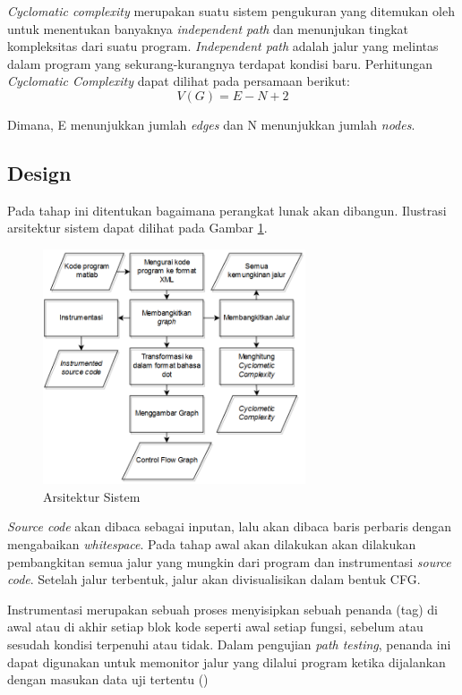 \textit{Cyclomatic complexity} merupakan suatu sistem pengukuran yang ditemukan oleh \citeauthor{MCCABE} untuk menentukan banyaknya \textit{independent path} dan menunjukan tingkat kompleksitas dari suatu program. \textit{Independent path} adalah jalur yang melintas dalam program yang sekurang-kurangnya terdapat kondisi baru. Perhitungan \textit{Cyclomatic Complexity} dapat dilihat pada persamaan berikut:
\[V(G)=E-N+2\]

Dimana, E menunjukkan jumlah \textit{edges} dan N menunjukkan jumlah \textit{nodes}.

\subsection*{Design}
Pada tahap ini ditentukan bagaimana perangkat lunak akan dibangun. Ilustrasi arsitektur sistem dapat dilihat pada Gambar \ref{fig:struktur}.
\begin{figure}[h!]
	\centering
	\includegraphics[width=220pt]{gambar/struktur}
	\caption{Arsitektur Sistem}
	\label{fig:struktur}
\end{figure}

\textit{Source code} akan dibaca sebagai inputan, lalu akan dibaca baris perbaris  dengan mengabaikan \textit{whitespace}. Pada tahap awal akan dilakukan akan dilakukan pembangkitan semua jalur yang mungkin dari program dan instrumentasi \textit{source code}. Setelah jalur terbentuk, jalur akan divisualisikan dalam bentuk CFG. 

Instrumentasi merupakan sebuah proses menyisipkan sebuah penanda (tag) di awal atau di akhir setiap blok kode seperti awal setiap fungsi, sebelum atau sesudah kondisi terpenuhi atau tidak. Dalam pengujian \textit{path testing}, penanda ini dapat digunakan untuk memonitor jalur yang dilalui program ketika dijalankan dengan masukan data uji tertentu (\cite{IRH2014})


